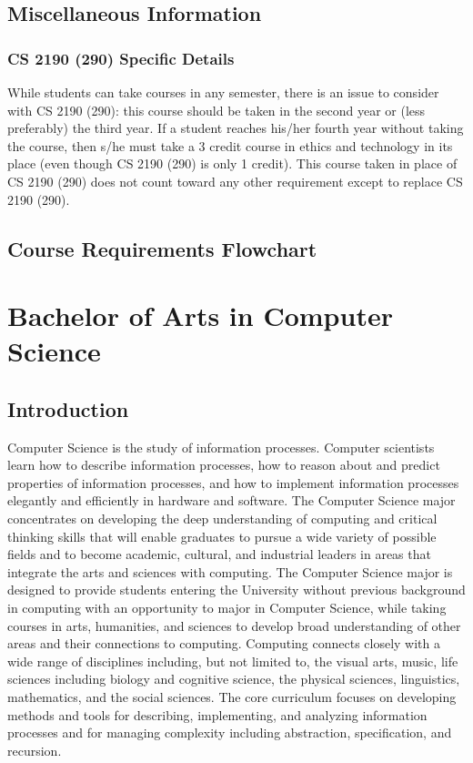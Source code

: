 \documentclass[10pt,letter]{book}
\newcommand{\mychapter}[2]{\chapter{#1}\renewcommand{\leftmark}{\textsc{#2}}}
\newcommand{\mysection}[1]{\section{#1}\renewcommand{\rightmark}{#1}}
\begin{document}
\mysection{Miscellaneous Information}
\subsection{CS 2190 (290) Specific Details}

While students can take courses in any semester, there is an issue to
consider with CS 2190 (290): this course should be taken in the second
year or (less preferably) the third year. If a student reaches his/her
fourth year without taking the course, then s/he must take a 3 credit
course in ethics and technology in its place (even though CS 2190
(290) is only 1 credit). This course taken in place of CS 2190 (290)
does not count toward any other requirement except to replace CS 2190
(290).



\clearpage
\mysection{Course Requirements Flowchart}

\begin{figure}[h!]
\end{figure}


\clearpage
\mychapter{Bachelor of Arts in Computer Science}{BA CS Degree}

\mysection{Introduction}

Computer Science is the study of information processes. Computer
scientists learn how to describe information processes, how to reason
about and predict properties of information processes, and how to
implement information processes elegantly and efficiently in hardware
and software. The Computer Science major concentrates on developing
the deep understanding of computing and critical thinking skills that
will enable graduates to pursue a wide variety of possible fields and
to become academic, cultural, and industrial leaders in areas that
integrate the arts and sciences with computing. The Computer Science
major is designed to provide students entering the University without
previous background in computing with an opportunity to major in
Computer Science, while taking courses in arts, humanities, and
sciences to develop broad understanding of other areas and their
connections to computing. Computing connects closely with a wide range
of disciplines including, but not limited to, the visual arts, music,
life sciences including biology and cognitive science, the physical
sciences, linguistics, mathematics, and the social sciences. The core
curriculum focuses on developing methods and tools for describing,
implementing, and analyzing information processes and for managing
complexity including abstraction, specification, and recursion. 
\end{document}
